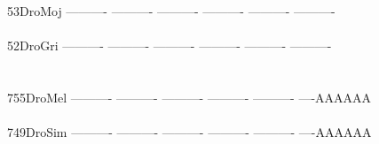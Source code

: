 \documentclass[11pt,twoside,reqno,a4paper]{article}
\begin{document}
{53\hspace*{3\charwidth}DroMoj	----------	----------	----------	----------	----------	----------	\\
\hspace*{5\charwidth}\hspace*{7\charwidth}\hspace*{1\charwidth}\hspace*{1\charwidth}\hspace*{1\charwidth}\hspace*{1\charwidth}\hspace*{1\charwidth}\hspace*{1\charwidth}\\
52\hspace*{3\charwidth}DroGri	----------	----------	----------	----------	----------	----------	\\
\hspace*{5\charwidth}\hspace*{7\charwidth}\hspace*{1\charwidth}\hspace*{1\charwidth}\hspace*{1\charwidth}\hspace*{1\charwidth}\hspace*{1\charwidth}\hspace*{1\charwidth}\\
\\
755\hspace*{2\charwidth}DroMel	----------	----------	----------	----------	----------	----AAAAAA	\\
\hspace*{5\charwidth}\hspace*{7\charwidth}\hspace*{1\charwidth}\hspace*{1\charwidth}\hspace*{1\charwidth}\hspace*{1\charwidth}\hspace*{1\charwidth}\hspace*{1\charwidth}\\
749\hspace*{2\charwidth}DroSim	----------	----------	----------	----------	----------	----AAAAAA	\\
\hspace*{5\charwidth}\hspace*{7\charwidth}\hspace*{1\charwidth}\hspace*{1\charwidth}\hspace*{1\charwidth}\hspace*{1\charwidth}\hspace*{1\charwidth}\hspace*{1\charwidth}\\
}
\end{document}
